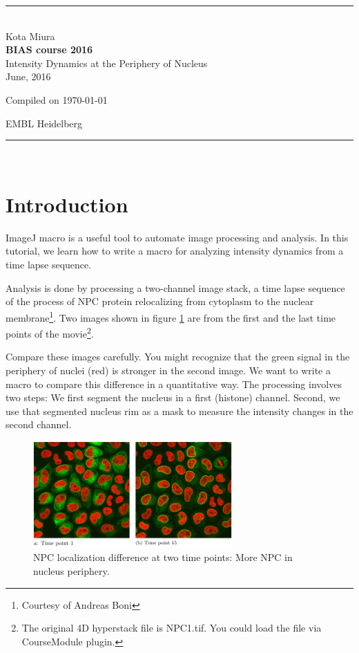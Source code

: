 \documentclass[11pt,a4paper,oneside]{report}
\newcommand{\HRule}{\rule{\linewidth}{0.5mm}}
\newcommand*{\titleTH}{\begingroup
\raggedleft
\HRule\\
\vspace*{\baselineskip}
{\Large Kota Miura}\\[0.167\textheight]

{\bfseries BIAS course 2016}\\[\baselineskip]
{\textcolor{Medium}{\Huge Intensity Dynamics at the Periphery of Nucleus }}\\[\baselineskip]
{\small June, 2016}\par
\vfill

{\small Compiled on \today}\par
{\Large EMBL Heidelberg}\par
\vspace*{3\baselineskip}
\HRule\\
\endgroup}
\begin{document}
\date{\today}

\pagestyle{empty}
\titleTH
\clearpage
\pagestyle{fancyplain}

\begingroup
\hypersetup{linkcolor=black}
\tableofcontents
\endgroup

\clearpage

\setcounter{chapter}{9}


\clearpage{}\section{Introduction}

ImageJ macro is a useful tool to automate image processing and analysis. In this tutorial, we learn how to write a macro for analyzing intensity dynamics from a time lapse sequence. 

Analysis is done by processing a two-channel image stack, a time lapse sequence of the process of NPC protein relocalizing from cytoplasm to the nuclear membrane\footnote{Courtesy of Andreas Boni}. Two images shown in figure \ref{fig:NucStrategy}  are from the first and the last time points of the movie\footnote{The original 4D hyperstack file is NPC1.tif. You could load the file via CourseModule plugin.}.

Compare these images carefully. You might recognize that the green signal in the periphery of nuclei (red) is stronger in the second image. We want to write a macro to compare this difference in a quantitative way. The processing involves two steps: We first segment the nucleus in a first (histone) channel. Second, we use that segmented nucleus rim as a mask to measure the intensity changes in the second channel. 

\begin{figure}[htbp]
\centering
\includegraphics[width=3in]{nucsegfig-NucStrategy.pdf}

 \caption{NPC localization difference at two time points: More NPC in nucleus periphery. }

 \label{fig:NucStrategy}
\end{figure}
\end{document}
